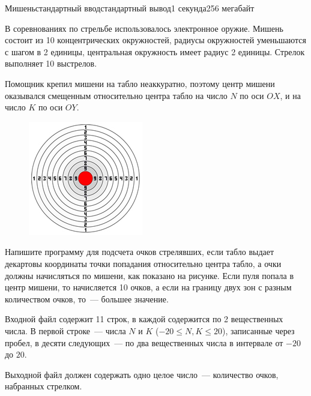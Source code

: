 \begin{problem}{Мишень}{стандартный ввод}{стандартный вывод}{1 секунда}{256 мегабайт}

В соревнованиях по стрельбе использовалось электронное оружие. Мишень состоит из 10 концентрических окружностей, радиусы окружностей уменьшаются с шагом в 2 единицы, центральная окружность имеет радиус 2 единицы.  Стрелок выполняет 10 выстрелов.

Помощник крепил мишени на табло неаккуратно, поэтому центр мишени оказывался смещенным относительно центра табло на число $N$ по оси $OX$, и на число $K$ по оси $OY$.

\begin{figure}[h]
\centering
\includegraphics[width=.4\textwidth, bb=0 0 200 200]{Target.jpg}
\end{figure}

Напишите программу для подсчета очков стрелявших, если табло выдает декартовы координаты точки попадания относительно центра табло, а очки должны начисляться по мишени, как показано на рисунке. Если пуля попала в центр мишени, то начисляется 10 очков, а если на границу двух зон с разным количеством очков, то~--- большее значение. 



\InputFile
Входной файл содержит 11 строк, в каждой содержится по 2 вещественных числа. В первой строке~--- числа $N$ и $K$ ($-20 \le N, K \le 20$), записанные через пробел, в десяти следующих~--- по два вещественных числа в интервале от $-20$ до $20$.

\OutputFile
Выходной файл должен содержать одно целое число~--- количество очков, набранных стрелком. 

\Examples

\begin{example}
%
\end{example}

\begin{example}
\end{example}

\end{problem}

